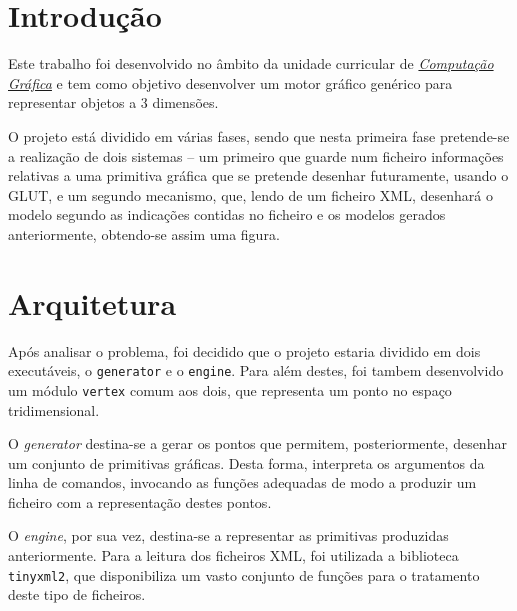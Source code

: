 \documentclass[a4paper, 11pt]{article}
\begin{document}
\pagebreak

\tableofcontents

\listoffigures

\pagebreak


\pagestyle{fancy}
\fancyhf{}


\renewcommand{\headrulewidth}{0pt}

\section{Introdução}

Este trabalho foi desenvolvido no âmbito da unidade curricular de
\href{https://miei.di.uminho.pt/plano_estudos.html#computa_o_gr_fica}{\emph{Computação Gráfica}} 
e tem como objetivo desenvolver um motor gráfico genérico para representar objetos a 3 dimensões.

O projeto está dividido em várias fases, sendo que nesta primeira fase pretende-se a realização 
de dois sistemas -- um primeiro que guarde num ficheiro informações relativas a uma primitiva 
gráfica que se pretende desenhar futuramente, usando o GLUT, e um segundo mecanismo, que, lendo de 
um ficheiro XML, desenhará o modelo segundo as indicações contidas no ficheiro e os modelos gerados
anteriormente, obtendo-se assim uma figura.

\section{Arquitetura}

Após analisar o problema, foi decidido que o projeto estaria dividido em dois executáveis, o 
\texttt{generator} e o \texttt{engine}. Para além destes, foi tambem desenvolvido um módulo 
\texttt{vertex} comum aos dois, que representa um ponto no espaço tridimensional.

O \textit{generator} destina-se a gerar os pontos que permitem, posteriormente, desenhar um 
conjunto de primitivas gráficas. Desta forma, interpreta os argumentos da linha de comandos, 
invocando as funções adequadas de modo a produzir um ficheiro com a representação destes pontos.

O \textit{engine}, por sua vez, destina-se a representar as primitivas produzidas anteriormente. 
Para a leitura dos ficheiros XML, foi utilizada a biblioteca \texttt{tinyxml2}, que disponibiliza
um vasto conjunto de funções para o tratamento deste tipo de ficheiros.
\end{document}

